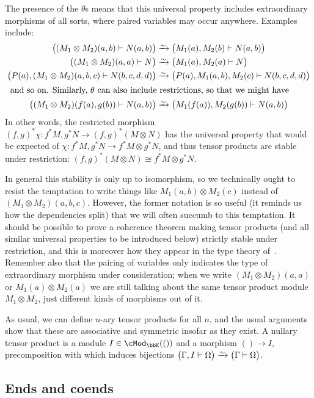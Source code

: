 \documentclass{amsart}
\newcommand{\K}{\bbK}
\let\mod\cMod
\def\modk{\mod_\K}
\let\mto\vdash    %
\def\mhom#1#2{\left( #1 \vphantom{\big|}\mto #2 \right)}
\begin{document}
The presence of the $\theta$s means that this universal property includes extraordinary morphisms of all sorts, where paired variables may occur anywhere.
Examples include:
\begin{align*}
  \mhom{(M_1 \otimes M_2)(a,b)}{N(a,b)} &\toiso \mhom{M_1(a), M_2(b)}{N(a,b)}\\
  \mhom{(M_1 \otimes M_2)(a,a)}{N} &\toiso \mhom{M_1(a), M_2(a)}{N}\\
  \mhom{P(a),(M_1 \otimes M_2)(a,b,c)}{N(b,c,d,d)} &\toiso \mhom{P(a),M_1(a,b), M_2(c)}{N(b,c,d,d)}\\
\intertext{
and so on.
Similarly, $\theta$ can also include restrictions, so that we might have}
  \mhom{(M_1\otimes M_2)(f(a),g(b))}{N(a,b)} &\toiso \mhom{M_1(f(a)),M_2(g(b))}{N(a,b)}
\end{align*}
In other words, the restricted morphism $(f,g)^*\chi : f^*M, g^*N \to (f,g)^*(M\otimes N)$ has the universal property that would be expected of $\chi: f^*M, g^*N \to f^*M \otimes g^*N$, and thus tensor products are stable under restriction: $ (f,g)^*(M\otimes N) \cong  f^*M \otimes g^*N$.

In general this stability is only up to isomorphism, so we technically ought to resist the temptation to write things like $M_1(a,b)\otimes M_2(c)$ instead of $(M_1 \otimes M_2)(a,b,c)$.
However, the former notation is so useful (it reminds us how the dependencies split) that we will often succumb to this temptation.
It should be possible to prove a coherence theorem making tensor products (and all similar universal properties to be introduced below) strictly stable under restriction, and this is moreover how they appear in the type theory of~\cite{lnss:dirtt}.
Remember also that the pairing of variables only indicates the type of extraordinary morphism under consideration; when we write $(M_1 \otimes M_2)(a,a)$ or $M_1(a)\otimes M_2(a)$ we are still talking about the same tensor product module $M_1\otimes M_2$, just different kinds of morphisms out of it.

As usual, we can define $n$-ary tensor products for all $n$, and the usual arguments show that these are associative and symmetric insofar as they exist.
A nullary tensor product is a module $I\in \modk(())$ and a morphism $() \to I$, precomposition with which induces bijections $\mhom{\Gamma,I}{\Omega} \toiso \mhom\Gamma \Omega$.

\subsection{Ends and coends}
\label{sec:ends-coends}
\end{document}
